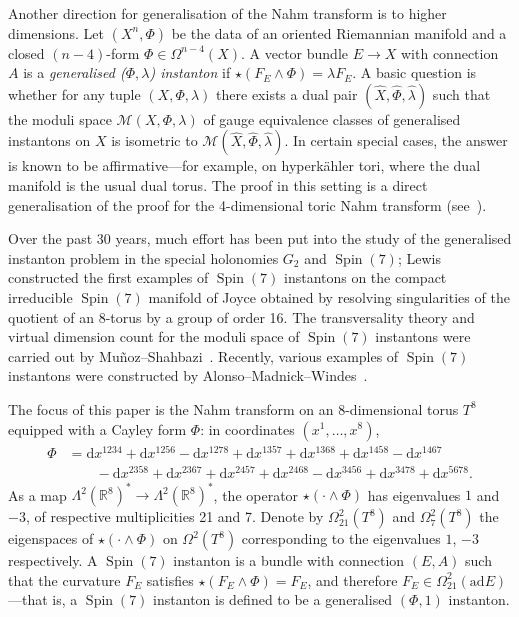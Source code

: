 \documentclass{article}
\newcommand{\di}{\mathrm{d}}
\newcommand{\wh}{\widehat}
\newcommand{\real}{\mathbb{R}}
\newcommand{\ad}{\mathrm{ad}}
\newcommand{\calM}{\mathcal{M}}
\DeclareMathOperator\Spin{Spin}
\theoremstyle{definition}
\theoremstyle{remark}
\begin{document}
Another direction for generalisation of the Nahm transform is to higher dimensions.
Let $(X^n, \Phi)$ be the data of an oriented Riemannian manifold and a closed $(n-4)$-form $\Phi \in \Omega^{n-4}(X)$.
A vector bundle $E \to X$ with connection $A$ is a \emph{generalised ($\Phi,\lambda$) instanton} if $\star (F_E \wedge \Phi) = \lambda F_E$.
A basic question is whether for any tuple $(X, \Phi, \lambda)$ there exists a dual pair $(\wh{X}, \wh{\Phi}, \wh{\lambda})$ such that the moduli space $\calM(X,\Phi,\lambda)$ of gauge equivalence classes of generalised instantons on $X$ is isometric to $\calM(\wh{X},\wh{\Phi}, \wh{\lambda})$.
In certain special cases, the answer is known to be affirmative---for example, on hyperk\"ahler tori, where the dual manifold is the usual dual torus.
The proof in this setting is a direct generalisation of the proof for the 4-dimensional toric Nahm transform (see~\cite{bartocciFourierMukaiNahmTransforms2009}).

Over the past 30 years, much effort has been put into the study of the generalised instanton problem in the special holonomies $G_2$ and $\Spin(7)$; Lewis~\cite{lewisSpin7Instantons} constructed the first examples of $\Spin(7)$ instantons on the compact irreducible $\Spin(7)$ manifold of Joyce obtained by resolving singularities of the quotient of an $8$-torus by a group of order 16.
The transversality theory and virtual dimension count for the moduli space of $\Spin(7)$ instantons were carried out by Mu\~noz--Shahbazi~\cite{munozTransversalityModuliSpace2018}.
Recently, various examples of $\Spin(7)$ instantons were constructed by Alonso--Madnick--Windes~\cite{alonsoGT2025}.

The focus of this paper is the Nahm transform on an 8-dimensional torus $T^8$ equipped with a Cayley form $\Phi$: in coordinates $(x^1, \ldots, x^8)$,
\begin{align}
    \Phi &= \di x^{1234} + \di x^{1256} - \di x^{1278} + \di x^{1357} + \di x^{1368} + \di x^{1458} - \di x^{1467}  \nonumber \\
         &\qquad - \di x^{2358} + \di x^{2367}  + \di x^{2457} + \di x^{2468}  - \di x^{3456} + \di x^{3478}  + \di x^{5678}. \label{eq:cayley}
\end{align}
As a map $\Lambda^2(\real^8)^* \to \Lambda^2(\real^8)^*$, the operator $\star (\cdot \wedge \Phi)$ has eigenvalues $1$ and $-3$, of respective multiplicities 21 and 7.
Denote by $\Omega^2_{21}(T^8)$ and $\Omega^2_7(T^8)$ the eigenspaces of $\star (\cdot \wedge \Phi)$ on $\Omega^2(T^8)$ corresponding to the eigenvalues $1$, $-3$ respectively.
A $\Spin(7)$ instanton is a bundle with connection $(E, A)$ such that the curvature $F_E$ satisfies $\star (F_E \wedge \Phi) = F_E$, and therefore $F_E \in \Omega^2_{21}(\ad E)$---that is, a $\Spin(7)$ instanton is defined to be a generalised $(\Phi, 1)$ instanton.
\end{document}
